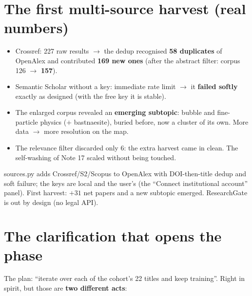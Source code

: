\documentclass[11pt,a4paper]{article}
\begin{document}
\section{The first multi-source harvest (real numbers)}

\begin{itemize}
  \item Crossref: 227 raw results $\rightarrow$ the dedup recognised \textbf{58 duplicates} of
        OpenAlex and contributed \textbf{169 new ones} (after the abstract filter: corpus 126
        $\rightarrow$ \textbf{157}).
  \item Semantic Scholar without a key: immediate rate limit $\rightarrow$ it \textbf{failed
        softly} exactly as designed (with the free key it is stable).
  \item The enlarged corpus revealed an \textbf{emerging subtopic}: bubble and fine-particle
        physics ($+$ bastnaesite), buried before, now a cluster of its own. More data
        $\rightarrow$ more resolution on the map.
  \item The relevance filter discarded only 6: the extra harvest came in clean. The
        self-washing of Note 17 scaled without being touched.
\end{itemize}

\begin{resumen}
sources.py adds Crossref/S2/Scopus to OpenAlex with DOI-then-title dedup and soft failure; the
keys are local and the user's (the ``Connect institutional account'' panel). First harvest:
$+31$ net papers and a new subtopic emerged. ResearchGate is out by design (no legal API).
\end{resumen}
\clearpage
{}
{}

\section{The clarification that opens the phase}

The plan: ``iterate over each of the cohort's 22 titles and keep training''. Right in spirit,
but those are \textbf{two different acts}:
\end{document}
